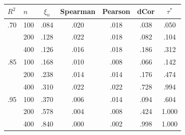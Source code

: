 \begin{tabular}{llccccc}
\toprule
$R^2$ & $n$ & $\xi_n$ & Spearman & Pearson & dCor & $\tau^*$ \\
\midrule
.70 & 100 & .084 & .020 & .018 & .038 & .050 \\
 & 200 & .128 & .022 & .018 & .082 & .104 \\
 & 400 & .126 & .016 & .018 & .186 & .312 \\
.85 & 100 & .168 & .010 & .008 & .066 & .142 \\
 & 200 & .238 & .014 & .014 & .176 & .474 \\
 & 400 & .310 & .022 & .022 & .728 & .994 \\
.95 & 100 & .370 & .006 & .014 & .094 & .604 \\
 & 200 & .578 & .004 & .008 & .424 & 1.000 \\
 & 400 & .840 & .000 & .002 & .998 & 1.000 \\
\bottomrule
\end{tabular}
